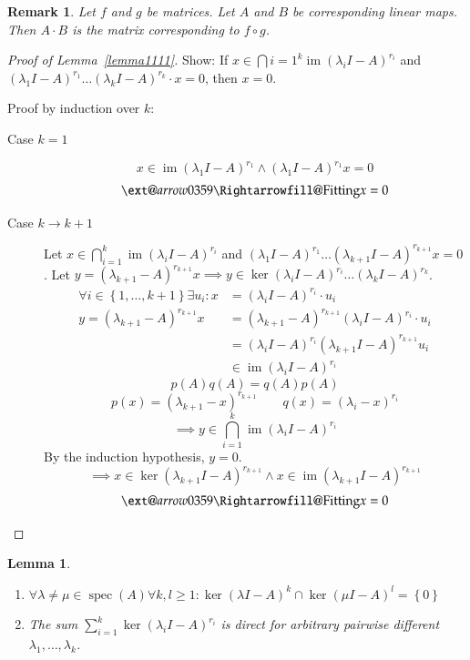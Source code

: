 \documentclass[a4paper]{article}
\makeatletter
\newcounter{lecref}[section]
\numberwithin{lecref}{section}
\newtheorem{lemma}[lecref]{Lemma}
\newtheorem*{Remark}{Remark}
\newcommand{\set}[1]{\left\{#1\right\}}
\newcommand{\xRightarrow}[2][]{\ext@arrow 0359\Rightarrowfill@{#1}{#2}}
\DeclareMathOperator{\im}{im}
\makeatother
\begin{document}
\begin{Remark}
  Let $f$ and $g$ be matrices. Let $A$ and $B$ be corresponding linear maps.
  Then $A \cdot B$ is the matrix corresponding to $f \circ g$.
\end{Remark}

\begin{proof}[Proof of Lemma~\ref{lemma1111}]
  Show: If $x \in \bigcap{i=1}^k \im(\lambda_i I - A)^{r_i}$ and $(\lambda_1 I - A)^{r_1} \dots (\lambda_k I - A)^{r_k} \cdot x = 0$, then $x = 0$.

  Proof by induction over $k$:
  \begin{description}
    \item[Case $k=1$]
      \[ x \in \im(\lambda_1 I - A)^{r_1} \land (\lambda_1 I - A)^{r_1} x = 0 \]
      \[ \xRightarrow{\text{Fitting}} x = 0 \]
    \item[Case $k \to k+1$]
      Let $x \in \bigcap_{i=1}^k \im(\lambda_i I - A)^{r_i}$ and $(\lambda_1 I - A)^{r_1} \dots (\lambda_{k+1} I - A)^{r_{k+1}} x = 0$.
      Let $y = (\lambda_{k+1} - A)^{r_{k+1}} x \implies y \in \ker(\lambda_i I - A)^{r_i} \dots (\lambda_k I - A)^{r_k}$.
      \begin{align*}
        \forall i \in \set{1, \dots, k+1} \exists u_i: x &= (\lambda_i I - A)^{r_i} \cdot u_i \\
        y = (\lambda_{k+1} - A)^{r_{k+1}} x &= (\lambda_{k+1} - A)^{r_{k+1}} (\lambda_i I - A)^{r_i} \cdot u_i \\
          &= (\lambda_i I - A)^{r_i} (\lambda_{k+1} I - A)^{r_{k+1}} u_i \\
          &\in \im(\lambda_i I - A)^{r_i}
      \end{align*}
      \[ p(A) q(A) = q(A) p(A) \]
      \[ p(x) = (\lambda_{k+1} - x)^{r_{k+1}} \qquad q(x) = (\lambda_i - x)^{r_i} \]
      \[ \implies y \in \bigcap_{i=1}^{k} \im(\lambda_i I - A)^{r_i} \]
      By the induction hypothesis, $y = 0$.
      \[ \implies x \in \ker(\lambda_{k+1} I - A)^{r_{k+1}} \land x \in \im(\lambda_{k+1} I - A)^{r_{k+1}} \]
      \[ \xRightarrow{\text{Fitting}} x = 0 \]
  \end{description}
\end{proof}

\begin{lemma} \hfill{} %
  \label{le1113}%
  \begin{enumerate}
    \item $\forall \lambda \neq \mu \in \operatorname{spec}(A) \forall k,l \geq 1: \ker(\lambda I - A)^k \cap \ker(\mu I - A)^l = \set{0}$
    \item The sum $\sum_{i=1}^k \ker(\lambda_i I - A)^{r_i}$ is direct for arbitrary pairwise different $\lambda_1, \dots, \lambda_k$.
  \end{enumerate}
\end{lemma}
\end{document}
